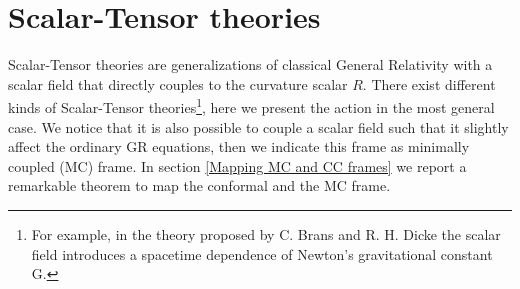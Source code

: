 


\chapter{Scalar-Tensor theories} \label{Scalar-tensor theories}
\thispagestyle{empty}
Scalar-Tensor theories are generalizations of classical General Relativity with a scalar field that directly couples to the curvature scalar $R$.
There exist different kinds of Scalar-Tensor theories\footnote{For example, in the theory proposed by C. Brans and R. H. Dicke \citep{brans-dicke_theory} the scalar field introduces a spacetime dependence of Newton's gravitational constant G.}, here we present the action in the most general case. We notice that it is also possible to couple a scalar field such that it slightly affect the ordinary GR equations, then we indicate this frame as minimally coupled (MC) frame. In section \ref{Mapping MC and CC frames} we report a remarkable theorem to map the conformal and the MC frame. 



